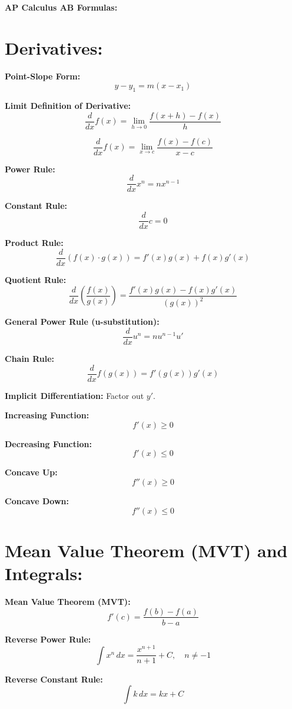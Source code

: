 \documentclass{article}
\begin{document}
\begin{center}
    {\fontsize{25}{16}\selectfont \textbf{AP Calculus AB Formulas:}} %
\end{center}

\section*{\textbf{Derivatives:}}

\textbf{Point-Slope Form:}
\[
y - y_1 = m(x - x_1)
\]

\textbf{Limit Definition of Derivative:}
\[
\frac{d}{dx} f(x) = \lim_{h\rightarrow 0} \frac{f(x+h) - f(x)}{h}
\]

\[
\frac{d}{dx} f(x) = \lim_{x\rightarrow c} \frac{f(x) - f(c)}{x-c}
\]

\textbf{Power Rule:}
\[
\frac{d}{dx} x^n = n x^{n - 1}
\]

\textbf{Constant Rule:}
\[
\frac{d}{dx} c = 0
\]

\textbf{Product Rule:}
\[
\frac{d}{dx} \left( f(x) \cdot g(x) \right) = f'(x) g(x) + f(x) g'(x)
\]

\textbf{Quotient Rule:}
\[
\frac{d}{dx} \left( \frac{f(x)}{g(x)} \right) = \frac{f'(x) g(x) - f(x) g'(x)}{(g(x))^2}
\]

\textbf{General Power Rule (u-substitution):}
\[
\frac{d}{dx} u^n = n u^{n - 1} u'
\]

\textbf{Chain Rule:}
\[
\frac{d}{dx} f(g(x)) = f'(g(x)) g'(x)
\]

\textbf{Implicit Differentiation:} Factor out \( y' \).

\textbf{Increasing Function:}
\[
f'(x) \geq 0
\]

\textbf{Decreasing Function:}
\[
f'(x) \leq 0
\]

\textbf{Concave Up:}
\[
f''(x) \geq 0
\]

\textbf{Concave Down:}
\[
f''(x) \leq 0
\]

\section*{\textbf{Mean Value Theorem (MVT) and Integrals:}}

\textbf{Mean Value Theorem (MVT):}
\[
f'(c) = \frac{f(b) - f(a)}{b - a}
\]

\textbf{Reverse Power Rule:}
\[
\int x^n \, dx = \frac{x^{n+1}}{n+1} + C, \quad n \neq -1
\]

\textbf{Reverse Constant Rule:}
\[
\int k \, dx = kx + C
\]
\end{document}
